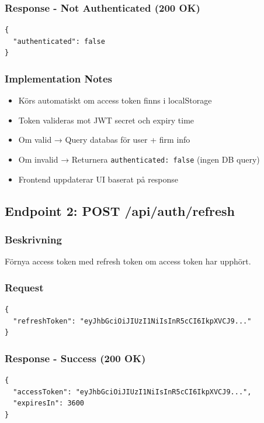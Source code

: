 \documentclass[12pt,a4paper]{article}
\begin{document}
\subsubsection{Response - Not Authenticated (200 OK)}
\begin{lstlisting}
{
  "authenticated": false
}
\end{lstlisting}

\subsubsection{Implementation Notes}
\begin{itemize}[noitemsep]
  \item Körs automatiskt om access token finns i localStorage
  \item Token valideras mot JWT secret och expiry time
  \item Om valid → Query databas för user + firm info
  \item Om invalid → Returnera \texttt{authenticated: false} (ingen DB query)
  \item Frontend uppdaterar UI baserat på response
\end{itemize}

\subsection{Endpoint 2: POST /api/auth/refresh}

\subsubsection{Beskrivning}
Förnya access token med refresh token om access token har upphört.

\subsubsection{Request}
\begin{lstlisting}
{
  "refreshToken": "eyJhbGciOiJIUzI1NiIsInR5cCI6IkpXVCJ9..."
}
\end{lstlisting}

\subsubsection{Response - Success (200 OK)}
\begin{lstlisting}
{
  "accessToken": "eyJhbGciOiJIUzI1NiIsInR5cCI6IkpXVCJ9...",
  "expiresIn": 3600
}
\end{lstlisting}
\end{document}
